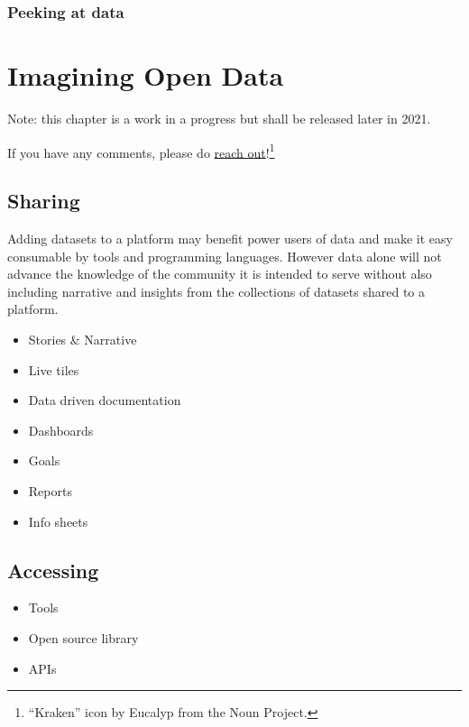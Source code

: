 \documentclass[
  openany]{book}
\providecommand{\tightlist}{%
  \setlength{\itemsep}{0pt}\setlength{\parskip}{0pt}}
\begin{document}
\hypertarget{peeking-at-data}{%
\subsection{Peeking at data}\label{peeking-at-data}}

\hypertarget{imagine}{%
\chapter{Imagining Open Data}\label{imagine}}

Note: this chapter is a work in a progress but shall be released later in 2021.

If you have any comments, please do \href{https://github.com/open-data-people/open-data-field-guide/discussions/new}{reach out}!\footnote{``Kraken'' icon by Eucalyp from the Noun Project.}

\hypertarget{sharing}{%
\section{Sharing}\label{sharing}}

Adding datasets to a platform may benefit power users of data and make it easy consumable by tools and programming languages. However data alone will not advance the knowledge of the community it is intended to serve without also including narrative and insights from the collections of datasets shared to a platform.

\begin{itemize}
\tightlist
\item
  Stories \& Narrative
\item
  Live tiles
\item
  Data driven documentation
\item
  Dashboards
\item
  Goals
\item
  Reports
\item
  Info sheets
\end{itemize}

\hypertarget{accessing}{%
\section{Accessing}\label{accessing}}

\begin{itemize}
\tightlist
\item
  Tools
\item
  Open source library
\item
  APIs
\end{itemize}
\end{document}
